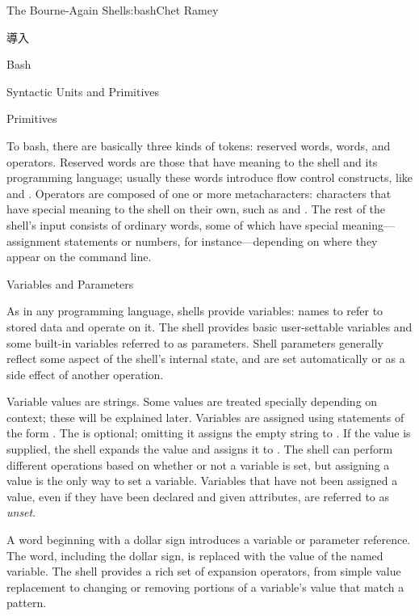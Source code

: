 \begin{aosachapter}{The Bourne-Again Shell}{s:bash}{Chet Ramey}
\begin{aosasect1}{導入}
\begin{aosasect2}{Bash}
\end{aosasect2}

\end{aosasect1}

\begin{aosasect1}{Syntactic Units and Primitives}

\begin{aosasect2}{Primitives}

To bash, there are basically three kinds of tokens: reserved
words, words, and operators.  Reserved words are those that have
meaning to the shell and its programming language; usually these words
introduce flow control constructs, like  and .
Operators are composed of one or more metacharacters: characters that
have special meaning to the shell on their own, such as \code{|} and
\code{{\textgreater}}.  The rest of the shell's input consists of
ordinary words, some of which have special meaning---assignment
statements or numbers, for instance---depending on where they appear
on the command line.

\end{aosasect2}

\begin{aosasect2}{Variables and Parameters}

As in any programming language, shells provide variables: names to
refer to stored data and operate on it.  The shell provides basic
user-settable variables and some built-in variables referred to as
parameters.  Shell parameters generally reflect some aspect of the
shell's internal state, and are set automatically or as a side effect
of another operation.

Variable values are strings.  Some values are treated specially
depending on context; these will be explained later.  Variables are
assigned using statements of the form .  The
 is optional; omitting it assigns the empty string to
.  If the value is supplied, the shell expands the value
and assigns it to .  The shell can perform different
operations based on whether or not a variable is set, but assigning a
value is the only way to set a variable.  Variables that have not been
assigned a value, even if they have been declared and given
attributes, are referred to as \emph{unset}.

A word beginning with a dollar sign introduces a variable or parameter
reference.  The word, including the dollar sign, is replaced with the
value of the named variable.  The shell provides a rich set of
expansion operators, from simple value replacement to changing or
removing portions of a variable's value that match a pattern.


\end{aosasect2}
\end{aosasect1}
\end{aosachapter}
